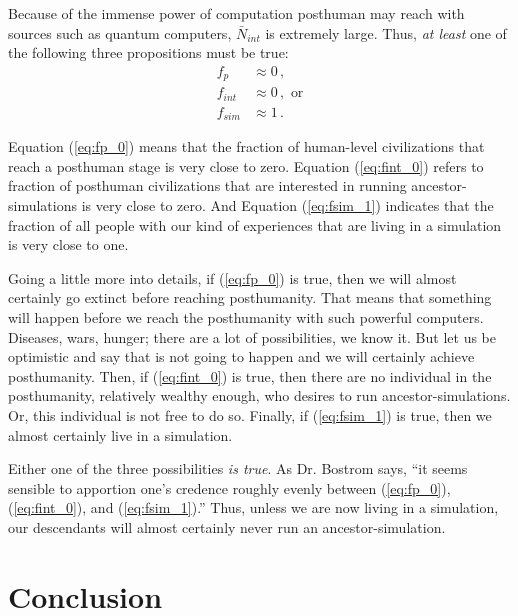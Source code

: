 \documentclass[twoside,11pt]{article}
\begin{document}
Because of the immense power of computation posthuman may reach with sources such as quantum computers, $\bar{N}_{int}$ is extremely large.
Thus, \emph{at least} one of the following three propositions must be true:
\begin{align}
	f_p &\approx  0\,, \label{eq:fp_0} \\
	f_{int} &\approx  0\,, \text{ or}  \label{eq:fint_0} \\
	f_{sim} &\approx  1 \,.\label{eq:fsim_1}
\end{align}



Equation (\ref{eq:fp_0}) means that the fraction of human-level civilizations that reach a posthuman stage is very close to zero.
Equation (\ref{eq:fint_0}) refers to fraction of posthuman civilizations that are interested in running ancestor-simulations is very close to zero.
And Equation (\ref{eq:fsim_1}) indicates that the fraction of all people with our kind of experiences that are living in a simulation is very close to one.

Going a little more into details, if (\ref{eq:fp_0}) is true, then we will almost certainly go extinct before reaching posthumanity.
That means that something will happen before we reach the posthumanity with such powerful computers.
Diseases, wars, hunger; there are a lot of possibilities, we know it.
But let us be optimistic and say that is not going to happen and we will certainly achieve posthumanity.
Then, if (\ref{eq:fint_0}) is true, then there are no individual in the posthumanity, relatively wealthy enough, who desires to run ancestor-simulations.
Or, this individual is not free to do so.
Finally, if (\ref{eq:fsim_1}) is true, then we almost certainly live in a simulation. 

Either one of the three possibilities \emph{is true}.
As Dr. Bostrom says, ``it seems sensible to apportion one’s credence roughly evenly between (\ref{eq:fp_0}), (\ref{eq:fint_0}), and (\ref{eq:fsim_1}).''
Thus, unless we are now living in a simulation, our descendants will almost certainly never run an ancestor-simulation.

\section{Conclusion}
\label{sec:conc}
\end{document}
